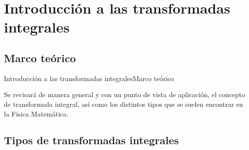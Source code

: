 \documentclass[10pt]{beamer}
\begin{document}
\section{Introducción a las transformadas integrales}
\subsection{Marco teórico}

\begin{frame}{Introducción a las transformadas integrales}{Marco teórico}

Se revisará de manera general y con un punto de vista de aplicación, el concepto de transformada integral, así como los distintos tipos que se suelen encontrar en la Física Matemática.




\end{frame}


\subsection{Tipos de transformadas integrales}
\end{document}

